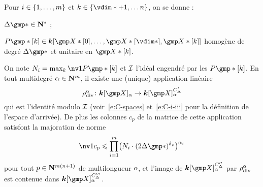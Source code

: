 \begin{lem}
  Pour \( i \in \{ 1, \dots, m \} \) et \( \ind \in \{ \vdim* + 1,
  \dots \dimp \} \), on se donne :
  \begin{enumthm}
    \item \( \Delta\mexp* \in \N^* \) ;
    \item \( P\mexp*[\ind]
      \in
      \cdn [ \vmp*[0], \dots, \vmp*[\vdim*], \vmp*[\ind] ] \)
      homogène de degré \( \Delta\mexp* \) et unitaire en \( \vmp*[\ind]
      \).
  \end{enumthm}
  On note \( N_\fct = \max_\ind \nv1 { P\mexp*[\ind] } \) et \( \mathcal I \)
  l'idéal engendré par les \( P\mexp*[\ind] \). En tout multidegré
  \( \alpha \in {\mathbf{N}}^m \), il existe une (unique) application linéaire
  \begin{equation}
    \rdiv^\alpha \colon \cdn [\vmp]_ \alpha \to \cdn [\vmp]_ \alpha^{C'_\Delta}
  \end{equation}
  qui est l'identité modulo \( \mathcal I \) (voir~\eqref{e:C-spaces}
  et~\eqref{e:C-i-iii} pour la définition de l'espace d'arrivée). De plus les
  colonnes \( c_p \) de la matrice de cette application satisfont la majoration
  de norme
  \begin{equation}
    \nv1{c_p}
    \le
    \prod\fctrange \bigl(
    N_\fct \cdot (2 \Delta\mexp*)^\dv
    \bigr) ^{\alpha_\fct}
  \end{equation}
  pour tout \( p \in {\mathbf{N}}^{m(n+1)} \) de multilongueur \( \alpha \), et
  l'image de \( \cdn [\vmp]_ \alpha ^{C''_\Delta} \) par \( \rho\sb{\mathrm{div }}^\alpha \) est
  contenue dans \( \cdn [\vmp]_ \alpha ^{C'''_\Delta} \).
\end{lem}

